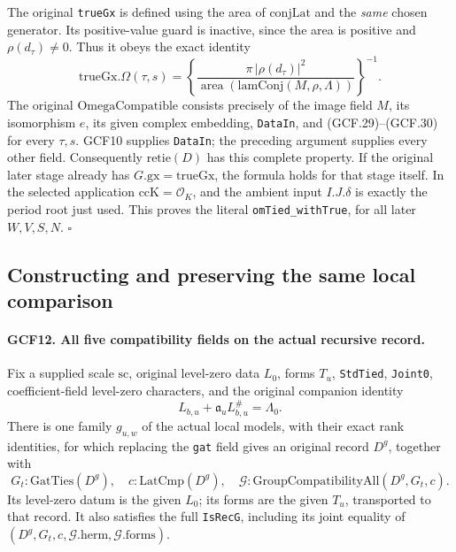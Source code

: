 The original \texttt{trueGx} is defined using the area of
\(\mathrm{conjLat}\) and the \emph{same} chosen generator.
Its positive-value guard is inactive, since the area is positive
and \(\rho(d_\tau)\ne0\).  Thus it obeys the exact identity
\[
 \mathrm{trueGx}.\Omega(\tau,s)
   =\left\{
       \frac{\pi\,|\rho(d_\tau)|^2}
       {\operatorname{area}(\mathrm{lamConj}(M,\rho,\Lambda))}
     \right\}^{-1}.                                  \tag{GCF.30}
\]
The original \(\mathrm{OmegaCompatible}\) consists precisely of
the image field \(M\), its isomorphism \(e\), its given complex
embedding, \texttt{DataIn}, and (GCF.29)--(GCF.30) for every
\(\tau,s\).  GCF10 supplies \texttt{DataIn}; the preceding argument
supplies every other field.  Consequently \(\mathrm{retie}(D)\)
has this complete property.  If the original later stage already has
\(G.\mathrm{gx}=\mathrm{trueGx}\), the formula holds for that
stage itself.  In the selected application \(\mathrm{ccK}=\mathcal
O_K\), and the ambient input \(I.J.\delta\) is exactly the period
root just used.  This proves the literal
\texttt{omTied\_withTrue}, for all later \(W,V,S,N\).
\hfill\(\square\)

\subsection{Constructing and preserving the same local comparison}

\paragraph{GCF12. All five compatibility fields on the actual recursive record.}
\label{claim:GCF12}
Fix a supplied scale \(\mathrm{sc}\), original level-zero data
\(L_0\), forms \(T_u\), \texttt{StdTied}, \texttt{Joint0},
coefficient-field level-zero characters, and the original companion
identity
\[
              L_{b,u}+\mathfrak a_u L_{b,u}^{\#}=\Lambda_0.
 \tag{GCF.31}
\]
There is one family \(g_{u,w}\) of the actual local models, with
their exact rank identities, for which replacing the \texttt{gat}
field gives an original record \(D^g\), together with
\[
 G_t:\mathrm{GatTies}(D^g),\quad c:\mathrm{LatCmp}(D^g),\quad
 \mathcal G:\mathrm{GroupCompatibilityAll}(D^g,G_t,c).
 \tag{GCF.32}
\]
Its level-zero datum is the given \(L_0\); its forms are the given
\(T_u\), transported to that record.  It also satisfies the full
\texttt{IsRecG}, including its joint equality of
\((D^g,G_t,c,\mathcal G.\mathrm{herm},\mathcal G.\mathrm{forms})\).

